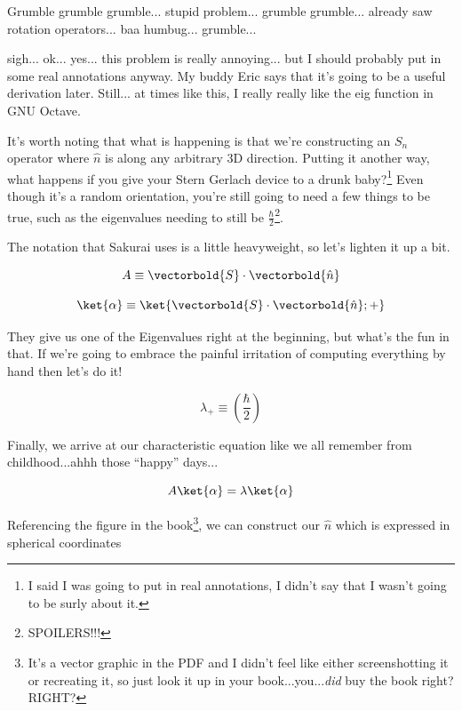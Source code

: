 \begin{answer}

  Grumble grumble grumble... stupid problem... grumble
  grumble... already saw rotation operators... baa
  humbug... grumble...

  sigh... ok... yes... this problem is really annoying... but I should
  probably put in some real annotations anyway.  My buddy Eric says
  that it's going to be a useful derivation later.  Still... at times
  like this, I really really like the eig function in GNU Octave.

  It's worth noting that what is happening is that we're constructing
  an $S_n$ operator where $\hat{n}$ is along any arbitrary 3D
  direction.  Putting it another way, what happens if you give your
  Stern Gerlach device to a drunk baby?\footnote{I said I was going to
  put in real annotations, I didn't say that I wasn't going to be
  surly about it.}  Even though it's a random orientation, you're
  still going to need a few things to be true, such as the eigenvalues
  needing to still be $\frac \hbar 2$\footnote{SPOILERS!!!}.

  The notation that Sakurai uses is a little heavyweight, so let's
  lighten it up a bit.

  \begin{equation}
    A \equiv \vectorbold{S}\cdot\vectorbold{\hat{n}}
  \end{equation}

  \begin{equation}
    \ket{\alpha} \equiv \ket{\vectorbold{S}\cdot\vectorbold{\hat{n}}; +}
  \end{equation}

  They give us one of the Eigenvalues right at the beginning, but
  what's the fun in that.  If we're going to embrace the painful
  irritation of computing everything by hand then let's do it!
  
  \begin{equation}
    \lambda_+ \equiv \left(\frac \hbar 2\right)
  \end{equation}

  Finally, we arrive at our characteristic equation like we all
  remember from childhood...ahhh those ``happy'' days...
  
  \begin{equation}
    A\ket{\alpha} = \lambda\ket{\alpha}
  \end{equation}

  Referencing the figure in the book\footnote{It's a vector graphic in
  the PDF and I didn't feel like either screenshotting it or
  recreating it, so just look it up in your book...you...\emph{did}
  buy the book right? RIGHT?}, we can construct our $\hat{n}$ which is
  expressed in spherical coordinates
  

\end{answer}
